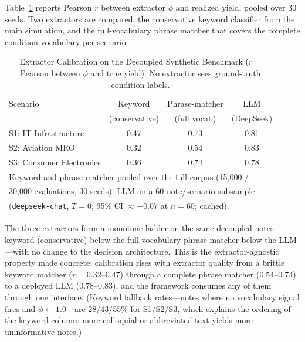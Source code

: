\documentclass[conference]{IEEEtran}
\begin{document}
Table~\ref{tab:calibration} reports Pearson $r$ between extractor $\phi$ and
realized yield, pooled over 30 seeds. Two extractors are compared: the
conservative keyword classifier from the main simulation, and the full-vocabulary
phrase matcher that covers the complete condition vocabulary per scenario.

\begin{table}[!t]
\caption{Extractor Calibration on the Decoupled Synthetic Benchmark
  ($r$ = Pearson between $\phi$ and true yield). No extractor sees
  ground-truth condition labels.}
\label{tab:calibration}
\centering\small
\begin{tabular}{lccc}
\toprule
Scenario & Keyword & Phrase-matcher & LLM \\
         & (conservative) & (full vocab) & (DeepSeek) \\
\midrule
S1: IT Infrastructure    & 0.47 & 0.73 & 0.81 \\
S2: Aviation MRO         & 0.32 & 0.54 & 0.83 \\
S3: Consumer Electronics & 0.36 & 0.74 & 0.78 \\
\bottomrule
\multicolumn{4}{l}{\footnotesize Keyword and phrase-matcher pooled over the full
  corpus (15{,}000 /}\\
\multicolumn{4}{l}{\footnotesize 30{,}000 evaluations, 30 seeds). LLM on a
  60-note/scenario subsample}\\
\multicolumn{4}{l}{\footnotesize (\texttt{deepseek-chat}, $T{=}0$; 95\% CI
  $\approx\pm0.07$ at $n{=}60$; cached).}\\
\end{tabular}
\end{table}

The three extractors form a monotone ladder on the same decoupled notes---keyword
(conservative) below the full-vocabulary phrase matcher below the LLM---with no
change to the decision architecture. This is the extractor-agnostic property made
concrete: calibration rises with extractor quality from a brittle keyword matcher
($r{=}0.32$--$0.47$) through a complete phrase matcher ($0.54$--$0.74$) to a
deployed LLM ($0.78$--$0.83$), and the framework consumes any of them through one
interface. (Keyword fallback rates---notes where no vocabulary signal fires and
$\phi{\gets}1.0$---are 28/43/55\% for S1/S2/S3, which explains the ordering of the
keyword column: more colloquial or abbreviated text yields more uninformative
notes.)
\end{document}
